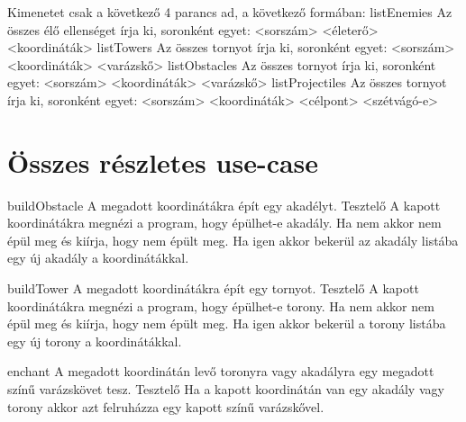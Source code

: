 Kimenetet csak a következő 4 parancs ad, a következő formában:\newline
\newline
listEnemies\newline
Az összes élő ellenséget írja ki, soronként egyet:\newline
<sorszám> <életerő> <koordináták>\newline
\newline
listTowers\newline
Az összes tornyot írja ki, soronként egyet:\newline
<sorszám> <koordináták> <varázskő>\newline
\newline
listObstacles\newline
Az összes tornyot írja ki, soronként egyet:\newline
<sorszám> <koordináták> <varázskő>\newline
\newline
listProjectiles\newline
Az összes tornyot írja ki, soronként egyet:\newline
<sorszám> <koordináták> <célpont> <szétvágó-e>\newline
\newline
\section{Összes részletes use-case}

\usecase
{buildObstacle}
{A megadott koordinátákra épít egy akadélyt.}
{Tesztelő}
{A kapott koordinátákra megnézi a program, hogy épülhet-e akadály. Ha nem akkor nem épül meg és kiírja, hogy nem épült meg.
Ha igen akkor bekerül az akadály listába egy új akadály a koordinátákkal.}

\usecase
{buildTower}
{A megadott koordinátákra épít egy tornyot.}
{Tesztelő}
{A kapott koordinátákra megnézi a program, hogy épülhet-e torony. Ha nem akkor nem épül meg és kiírja, hogy nem épült meg.
Ha igen akkor bekerül a torony listába egy új torony a koordinátákkal.}

\usecase
{enchant}
{A megadott koordinátán levő toronyra vagy akadályra egy megadott színű varázskövet tesz. }
{Tesztelő}
{Ha a kapott koordinátán van egy akadály vagy torony akkor azt felruházza egy kapott színű varázskővel.}

